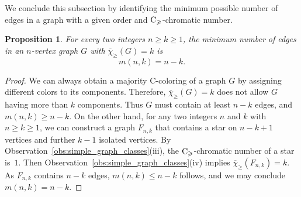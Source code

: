 \documentclass{article}
\newtheorem{proposition}[theorem]{Proposition}
\theoremstyle{definition}
\newcommand{\mc}{\overline{\chi}_{\geqslant}}
\newcommand{\cg}{{\rm C}_{\geqslant}}
\newcommand{\cs}[1]{{\textcolor{blue}{#1}}}
\newcommand{\hf}[1]{ \textcolor{orange}{HF: #1}}
\begin{document}
   We conclude this subsection by identifying the minimum possible number of edges in a graph with a given order and $\cg$-chromatic number.

   \begin{proposition}  \label{prop:m(n,k)}
       For every two integers $n \ge k \ge 1$, the minimum number of edges in an $n$-vertex graph $G$ with $\mc(G) =k$ is
       $$ m(n,k)= n-k.
       $$
   \end{proposition} 
      \begin{proof}
       We can always obtain a majority C-coloring of a graph $ G$ by assigning different colors to its components. Therefore, $\mc(G)=k$ does not allow $G$ having more than $k$ components. Thus $G$ must contain at least $n-k$ edges, and $m(n,k) \ge n-k$.  On the other hand, for any two integers $n$ and $k$ with $n \ge k \ge 1$, we can construct a graph $F_{n,k}$ that contains a star on $n-k+1$ vertices and further $k-1$ isolated vertices. By Observation~\ref{obs:simple_graph_classes}(iii), the $\cg$-chromatic number of a star  is~$1$. Then Observation~\ref{obs:simple_graph_classes}(iv) implies $\mc(F_{n,k})=k$.  As $F_{n,k}$ contains $n-k$ edges, $m(n,k) \le n-k$ follows, and we may conclude $m(n,k)=n-k$.
   \end{proof}

\end{document}
